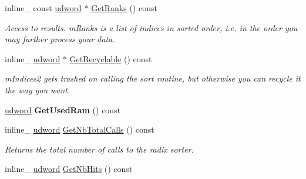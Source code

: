 \begin{DoxyCompactItemize}
\item 
\hypertarget{class_radix_sort_a705769648fdad72220225ca543b18f2d}{inline\+\_\+ const \hyperlink{_ice_types_8h_a44c6f1920ba5551225fb534f9d1a1733}{udword} $\ast$ \hyperlink{class_radix_sort_a705769648fdad72220225ca543b18f2d}{Get\+Ranks} () const }\label{class_radix_sort_a705769648fdad72220225ca543b18f2d}

\begin{DoxyCompactList}\small\item\em Access to results. m\+Ranks is a list of indices in sorted order, i.\+e. in the order you may further process your data. \end{DoxyCompactList}\item 
\hypertarget{class_radix_sort_a953a9429075bb3350b1d372972ca0d30}{inline\+\_\+ \hyperlink{_ice_types_8h_a44c6f1920ba5551225fb534f9d1a1733}{udword} $\ast$ \hyperlink{class_radix_sort_a953a9429075bb3350b1d372972ca0d30}{Get\+Recyclable} () const }\label{class_radix_sort_a953a9429075bb3350b1d372972ca0d30}

\begin{DoxyCompactList}\small\item\em m\+Indices2 gets trashed on calling the sort routine, but otherwise you can recycle it the way you want. \end{DoxyCompactList}\item 
\hypertarget{class_radix_sort_afc66aa956bc2e5078697d75436f9553b}{\hyperlink{_ice_types_8h_a44c6f1920ba5551225fb534f9d1a1733}{udword} {\bfseries Get\+Used\+Ram} () const }\label{class_radix_sort_afc66aa956bc2e5078697d75436f9553b}

\item 
\hypertarget{class_radix_sort_a3872636cd420e073d23b247bc00fa818}{inline\+\_\+ \hyperlink{_ice_types_8h_a44c6f1920ba5551225fb534f9d1a1733}{udword} \hyperlink{class_radix_sort_a3872636cd420e073d23b247bc00fa818}{Get\+Nb\+Total\+Calls} () const }\label{class_radix_sort_a3872636cd420e073d23b247bc00fa818}

\begin{DoxyCompactList}\small\item\em Returns the total number of calls to the radix sorter. \end{DoxyCompactList}\item 
\hypertarget{class_radix_sort_ac69a0a1cc27abac0bd986233dd5fc12a}{inline\+\_\+ \hyperlink{_ice_types_8h_a44c6f1920ba5551225fb534f9d1a1733}{udword} \hyperlink{class_radix_sort_ac69a0a1cc27abac0bd986233dd5fc12a}{Get\+Nb\+Hits} () const }\label{class_radix_sort_ac69a0a1cc27abac0bd986233dd5fc12a}


\end{DoxyCompactItemize}
